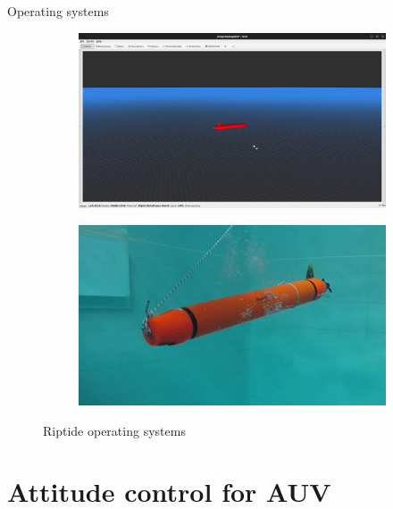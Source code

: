 \documentclass[10pt, xcolor={usenames, dvipsnames}]{beamer}
\begin{document}
        \begin{frame}{Operating systems}
            \begin{figure}
                \begin{subfigure}[c]{.5\textwidth}
                    \includegraphics[width=.95\textwidth]{imgs/simulation.png}
                \end{subfigure}%
                \begin{subfigure}[c]{.5\textwidth}
                    \includegraphics[width=.95\textwidth]{imgs/riptide.png}
                \end{subfigure}
                \caption{Riptide operating systems}
            \end{figure}
        \end{frame}

    \section{Attitude control for AUV}
\end{document}
